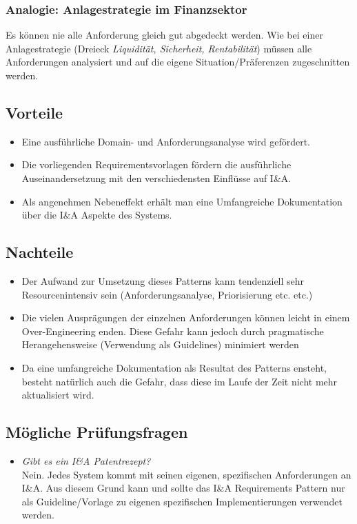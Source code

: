 \subsubsection*{Analogie: Anlagestrategie im Finanzsektor}
Es können nie alle Anforderung gleich gut abgedeckt werden. Wie bei einer Anlagestrategie (Dreieck \emph{Liquidität, Sicherheit, Rentabilität}) müssen alle Anforderungen analysiert und auf die eigene Situation/Präferenzen zugeschnitten werden.

\subsection*{Vorteile}
\begin{itemize}
	\item Eine ausführliche Domain- und Anforderungsanalyse wird gefördert.
	\item Die vorliegenden Requirementsvorlagen fördern die ausführliche Auseinandersetzung mit den verschiedensten Einflüsse auf I\&A.
	\item Als angenehmen Nebeneffekt erhält man eine Umfangreiche Dokumentation über die I\&A Aspekte des Systems.
\end{itemize}

\subsection*{Nachteile}
\begin{itemize}
	\item Der Aufwand zur Umsetzung dieses Patterns kann tendenziell sehr Resourcenintensiv sein (Anforderungsanalyse, Priorisierung etc. etc.)
	\item Die vielen Ausprägungen der einzelnen Anforderungen können leicht in einem Over-Engineering enden. Diese Gefahr kann jedoch durch pragmatische Herangehensweise (Verwendung als Guidelines) minimiert werden
	\item Da eine umfangreiche Dokumentation als Resultat des Patterns ensteht, besteht natürlich auch die Gefahr, dass diese im Laufe der Zeit nicht mehr aktualisiert wird.
\end{itemize}

\subsection*{Mögliche Prüfungsfragen}
\begin{itemize}
	\item \emph{Gibt es ein I\&A Patentrezept?}\\
	Nein. Jedes System kommt mit seinen eigenen, spezifischen Anforderungen an I\&A. Aus diesem Grund kann und sollte das I\&A Requirements Pattern nur als Guideline/Vorlage zu eigenen spezifischen Implementierungen verwendet werden.
\end{itemize}